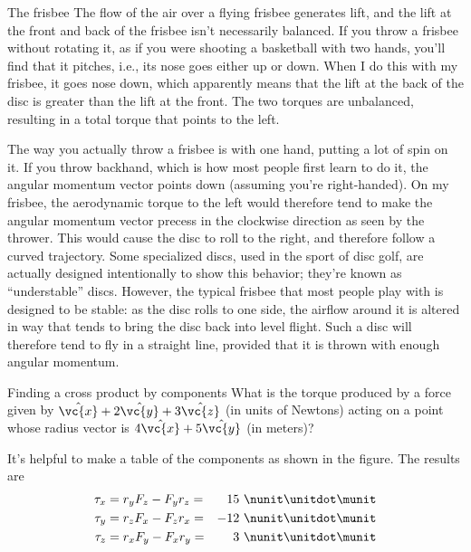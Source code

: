 \begin{eg}{The frisbee}
The flow of the air over a flying frisbee generates lift, and the lift
at the front and back of the frisbee isn't necessarily balanced.
If you throw a frisbee without rotating it, as if you were
shooting a basketball with two hands, you'll find that it
pitches, i.e., its nose goes either up or down. When I do this
with my frisbee, it goes nose down, which apparently means
that the lift at the back of the disc is greater than the lift at
the front. The two torques are unbalanced, resulting in a total
torque that points to the left.

The way you actually throw a frisbee is with one hand, putting a lot
of spin on it. If you throw backhand, which is how most people first
learn to do it, the angular momentum vector points down (assuming you're right-handed). On my
frisbee, the aerodynamic torque to the left would therefore tend
to make the angular momentum vector precess in the clockwise direction
as seen by the thrower. This would cause the disc to roll to the right,
and therefore follow a curved trajectory. Some specialized discs, used in the
sport of disc golf, are actually designed intentionally to show this behavior;
they're known as ``understable'' discs. However, the typical frisbee that most
people play with is designed to be stable: as the disc rolls to one side, the airflow
around it is altered in way that tends to bring the disc back into level flight. Such
a disc will therefore tend to fly in a straight line, provided that it is thrown
with enough angular momentum.
\end{eg}

\begin{eg}{Finding a cross product by components}\label{eg:xprodcomps}
\egquestion
What is the torque produced by a force given by
$\hat{\vc{x}}+2\hat{\vc{y}}+3\hat{\vc{z}}$
 (in units of Newtons) acting on a point whose radius
vector is $4\hat{\vc{x}}+5\hat{\vc{y}}$ (in meters)?

\eganswer
It's helpful to make a table of the components as
shown in the figure. The results are
\begin{alignat*}{2}
        \tau_x        &=   r_{y} F_{z} -  F_y r_{z} 
                        =&  15\ \nunit\unitdot\munit        \\
        \tau_y        &=   r_{z} F_x -  F_{z} r_{x} 
                        =&  - 12\ \nunit\unitdot\munit        \\
        \tau_z        &=   r_x F_{y} -  F_{x} r_y 
                        =&   3\ \nunit\unitdot\munit
\end{alignat*}
\end{eg}

